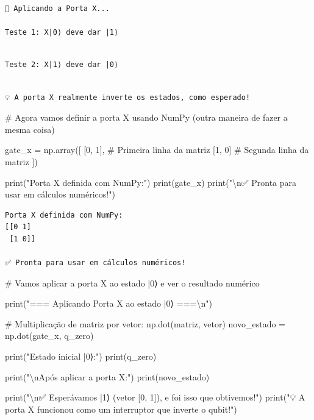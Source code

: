 \documentclass[
  brazilian,
]{report}
\newenvironment{Shaded}{\begin{snugshade}}{\end{snugshade}}
\newcommand{\NormalTok}[1]{\textcolor[rgb]{0.00,0.23,0.31}{#1}}
\begin{document}
\begin{verbatim}
🔄 Aplicando a Porta X...

Teste 1: X|0⟩ deve dar |1⟩
\end{verbatim}

\begin{verbatim}

Teste 2: X|1⟩ deve dar |0⟩
\end{verbatim}

\begin{verbatim}

💡 A porta X realmente inverte os estados, como esperado!
\end{verbatim}

\begin{Shaded}
\begin{Highlighting}[]

\NormalTok{\# Agora vamos definir a porta X usando NumPy (outra maneira de fazer a mesma coisa)}

\NormalTok{gate\_x = np.array([}
\NormalTok{    [0, 1],  \# Primeira linha da matriz}
\NormalTok{    [1, 0]   \# Segunda linha da matriz}
\NormalTok{])}

\NormalTok{print("Porta X definida com NumPy:")}
\NormalTok{print(gate\_x)}
\NormalTok{print("\textbackslash{}n✅ Pronta para usar em cálculos numéricos!")}
\end{Highlighting}
\end{Shaded}

\begin{verbatim}
Porta X definida com NumPy:
[[0 1]
 [1 0]]

✅ Pronta para usar em cálculos numéricos!
\end{verbatim}

\begin{Shaded}
\begin{Highlighting}[]

\NormalTok{\# Vamos aplicar a porta X ao estado |0⟩ e ver o resultado numérico}

\NormalTok{print("=== Aplicando Porta X ao estado |0⟩ ===\textbackslash{}n")}

\NormalTok{\# Multiplicação de matriz por vetor: np.dot(matriz, vetor)}
\NormalTok{novo\_estado = np.dot(gate\_x, q\_zero)}

\NormalTok{print("Estado inicial |0⟩:")}
\NormalTok{print(q\_zero)}

\NormalTok{print("\textbackslash{}nApós aplicar a porta X:")}
\NormalTok{print(novo\_estado)}

\NormalTok{print("\textbackslash{}n✅ Esperávamos |1⟩ (vetor [0, 1]), e foi isso que obtivemos!")}
\NormalTok{print("💡 A porta X funcionou como um \textquotesingle{}interruptor\textquotesingle{} que inverte o qubit!")}
\end{Highlighting}
\end{Shaded}
\end{document}
